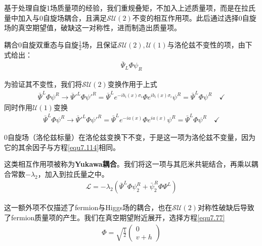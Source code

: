 基于处理自旋1场质量项的经验，我们重规叠矩，不加入上述质量项，而是在拉氏量中加入与0自旋场耦合，且满足$\mathcal{SU}(2)$不变的相互作用项。此后通过选择0自旋场的真空期望值，破缺这一对称性，进而制造出质量项。

耦合0自旋双重态与自旋$\frac{1}{2}$场，且保证$\mathcal{SU}(2),\mathcal{U}(1)$与洛伦兹不变性的项，由下式给出：
\begin{align}
\bar{\Psi}_L\Phi\psi_R
\label{7.116}
\end{align}

为验证其不变性，我们将$\mathcal{SU}(2)$变换作用于上式
\begin{align*}
\bar{\Psi}^L\Phi\psi^R\rightarrow\bar{\Psi}'^{L}\Phi\psi'^R=\bar{\Psi}^Le^{-ib_i(x)\sigma_i}\Phi e^{ib_i(x)\sigma_i}\psi^R=\bar{\Psi}^L\Phi\psi^R\quad\checkmark
\end{align*}
同时作用$\mathcal{U}(1)$变换
\begin{align*}
\bar{\Psi}^L\Phi\psi^R\rightarrow\bar{\Psi}'^{L}\Phi\psi'^R=\bar{\Psi}^Le^{-ia(x)}\Phi e^{ia(x)}\psi^R=\bar{\Psi}^L\Phi\psi^R\quad\checkmark
\end{align*}

0自旋场（洛伦兹标量）在洛伦兹变换下不变，于是这一项为洛伦兹不变量，因为它的其余因子与方程\ref{equ7.114}相同。

这类相互作用项被称为{\bf Yukawa耦合}。我们将这一项与其厄米共轭结合，再乘以耦合常数$-\lambda_2$，加入到拉氏量之中。
\begin{align}
\mathscr{L}=-\lambda_2(\bar{\Psi}^L\Phi\psi_2^R+\bar{\psi}^R_2\Phi\Psi^L)
\label{7.117}
\end{align}

这一额外项不仅描述了fermion与Higgs场的耦合，也在$\mathcal{SU}(2)$对称性破缺后导致了fermion质量项的产生。我们在真空期望附近展开，选择方程\ref{equ7.77}
\begin{align*}
\Phi=\sqrt{\frac{1}{2}}\begin{pmatrix}0 \\ v+h\end{pmatrix}
\end{align*}


